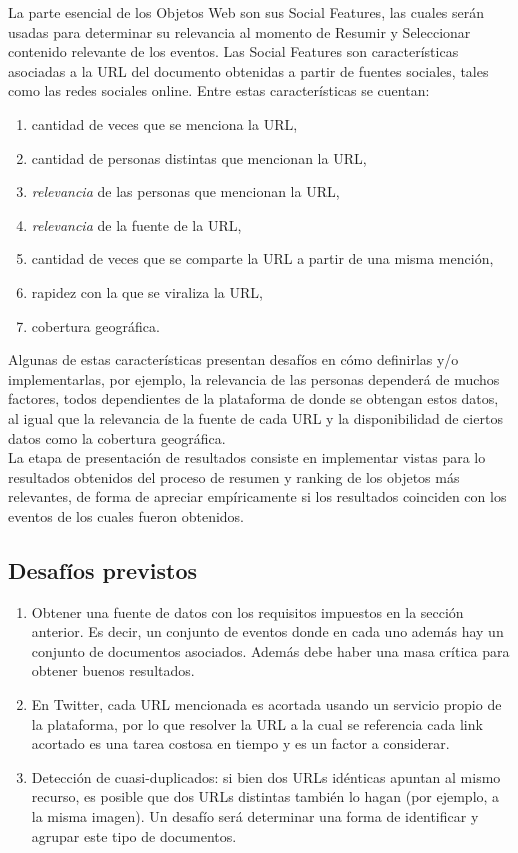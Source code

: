 \documentclass[11pt]{article}
\begin{document}
   La parte esencial de los Objetos Web son sus Social Features, las cuales serán usadas para determinar su relevancia al momento de Resumir y Seleccionar contenido relevante de los eventos. Las Social Features son características asociadas a la URL del documento obtenidas a partir de fuentes sociales, tales como las redes sociales online. Entre estas características se cuentan:\\

\begin{enumerate}
\item cantidad de veces que se menciona la URL,
\item cantidad de personas distintas que mencionan la URL,
\item \emph{relevancia} de las personas que mencionan la URL,
\item \emph{relevancia} de la fuente de la URL,
\item cantidad de veces que se comparte la URL a partir de una misma mención,
\item rapidez con la que se viraliza la URL,
\item cobertura geográfica.
\end{enumerate}
   Algunas de estas características presentan desafíos en cómo definirlas y/o implementarlas, por ejemplo, la relevancia de las personas dependerá de muchos factores, todos dependientes de la plataforma de donde se obtengan estos datos, al igual que la relevancia de la fuente de cada URL y la disponibilidad de ciertos datos como la cobertura geográfica.\\

   La etapa de presentación de resultados consiste en implementar vistas para lo resultados obtenidos del proceso de resumen y ranking de los objetos más relevantes, de forma de apreciar empíricamente si los resultados coinciden con los eventos de los cuales fueron obtenidos.
  

\subsection{Desafíos previstos}
\label{sec-3.1}

\begin{enumerate}
\item Obtener una fuente de datos con los requisitos impuestos en la sección anterior. Es decir, un conjunto de eventos donde en cada uno además hay un conjunto de documentos asociados. Además debe haber una masa crítica para obtener buenos resultados.
\item En Twitter, cada URL mencionada es acortada usando un servicio propio de la plataforma, por lo que resolver la URL a la cual se referencia cada link acortado es una tarea costosa en tiempo y es un factor a considerar.
\item Detección de cuasi-duplicados: si bien dos URLs idénticas apuntan al mismo recurso, es posible que dos URLs distintas también lo hagan (por ejemplo, a la misma imagen). Un desafío será determinar una forma de identificar y agrupar este tipo de documentos.
\end{enumerate}
\end{document}
